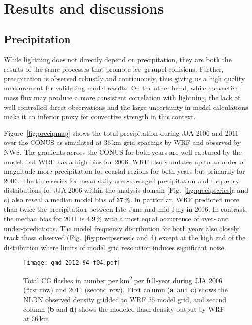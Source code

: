 \section{Results and discussions}\label{sec:results}

\subsection{Precipitation}\label{ssec:precip}

While lightning does not directly depend on precipitation, they are both the
results of the same processes that promote ice--graupel collisions. Further,
precipitation is observed robustly and continuously, thus giving us a high
quality measurement for validating model results. On the other hand, while
convective mass flux may produce a more consistent correlation with
lightning, the lack of well-controlled direct observations and the large
uncertainty in model calculations make it an inferior proxy for convective
strength in this context.

Figure~\ref{fig:precipmap} shows the total precipitation during JJA 2006 and
2011 over the CONUS as simulated at 36\,\unit{km} grid spacings by WRF and
observed by NWS. The gradients across the CONUS for both years are well
captured by the model, but WRF has a high bias for 2006. WRF also simulates
up to an order of magnitude more precipitation for coastal regions for both
years but primarily for 2006. The time series for mean daily area-averaged
precipitation and frequency distributions for JJA 2006 within the analysis
domain (Fig.~\ref{fig:precipseries}a and c) also reveal a median model bias
of 37\,{\%}. In particular, WRF predicted more than twice the precipitation
between late-June and mid-July in 2006. In contrast, the median bias for 2011
is 4.9\,{\%} with almost equal occurrence of over- and under-predictions. The
model frequency distribution for both years also closely track those observed
(Fig.~\ref{fig:precipseries}c and d) except at the high end of the
distribution where limits of model grid resolution induces significant noise.

\begin{figure*}[t]
      \texttt{[image: gmd-2012-94-f04.pdf]}
      \caption{Total CG flashes in number per \unit{km^2} per
          full-year during JJA 2006 (first row) and 2011 (second
          row). First column (\textbf{a}~and \textbf{c}) shows the NLDN observed
          density gridded to WRF 36 model grid, and second column
          (\textbf{b} and \textbf{d}) shows the modeled flash density output by
          WRF at 36\,\unit{km}.}
      \label{fig:cgmap}
\end{figure*}


